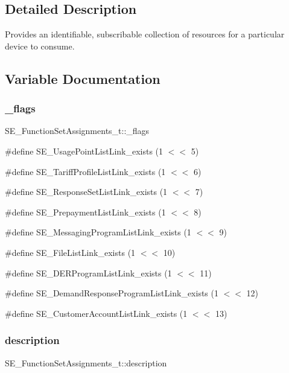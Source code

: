 \subsection{Detailed Description}
Provides an identifiable, subscribable collection of resources for a particular device to consume. 

\subsection{Variable Documentation}
\mbox{\label{group__FunctionSetAssignments_ga43199a4b6deab506dfea455cbd110bb1}} 
\subsubsection{\texorpdfstring{\+\_\+flags}{\_flags}}
{\footnotesize\ttfamily S\+E\+\_\+\+Function\+Set\+Assignments\+\_\+t\+::\+\_\+flags}

\#define S\+E\+\_\+\+Usage\+Point\+List\+Link\+\_\+exists (1 $<$$<$ 5)

\#define S\+E\+\_\+\+Tariff\+Profile\+List\+Link\+\_\+exists (1 $<$$<$ 6)

\#define S\+E\+\_\+\+Response\+Set\+List\+Link\+\_\+exists (1 $<$$<$ 7)

\#define S\+E\+\_\+\+Prepayment\+List\+Link\+\_\+exists (1 $<$$<$ 8)

\#define S\+E\+\_\+\+Messaging\+Program\+List\+Link\+\_\+exists (1 $<$$<$ 9)

\#define S\+E\+\_\+\+File\+List\+Link\+\_\+exists (1 $<$$<$ 10)

\#define S\+E\+\_\+\+D\+E\+R\+Program\+List\+Link\+\_\+exists (1 $<$$<$ 11)

\#define S\+E\+\_\+\+Demand\+Response\+Program\+List\+Link\+\_\+exists (1 $<$$<$ 12)

\#define S\+E\+\_\+\+Customer\+Account\+List\+Link\+\_\+exists (1 $<$$<$ 13) \mbox{\label{group__FunctionSetAssignments_ga93b00fabe30a35c1cbd436181e3c7d50}} 
\subsubsection{\texorpdfstring{description}{description}}
{\footnotesize\ttfamily S\+E\+\_\+\+Function\+Set\+Assignments\+\_\+t\+::description}

